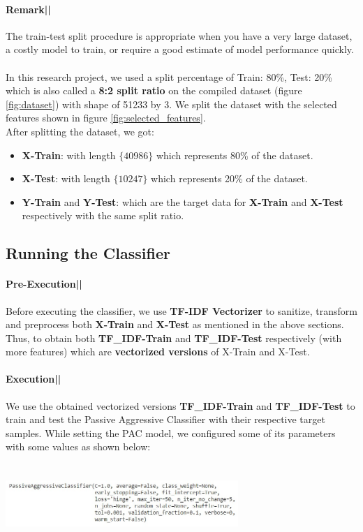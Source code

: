 \documentclass[11.5pt]{article}
\begin{document}
\begin{multicols}{2}
\paragraph{Remark||}
The train-test split procedure is appropriate when you have a very large dataset, a costly model to train, or require a good estimate of model performance quickly.
\paragraph{}
In this research project, we used a split percentage of Train: 80\%, Test: 20\% which is also called a \textbf{8:2 split ratio} on the compiled dataset (figure \ref{fig:dataset}) with shape of 51233 by 3. We split the dataset with the selected features shown in figure \ref{fig:selected_features}.\\
After splitting the dataset, we got:
\begin{itemize}
    \item \textbf{X-Train}: with length $\{40986\}$ which represents 80\% of the dataset.
    \item \textbf{X-Test}: with length $\{10247\}$ which represents 20\% of the dataset.
    \item \textbf{Y-Train} and \textbf{Y-Test}: which are the target data for \textbf{X-Train} and \textbf{X-Test} respectively with the same split ratio.
\end{itemize}

\subsection{Running the Classifier}
\paragraph{Pre-Execution||}
Before executing the classifier, we use \textbf{TF-IDF Vectorizer} to sanitize, transform and preprocess both \textbf{X-Train} and \textbf{X-Test} as mentioned in the above sections. Thus, to obtain both \textbf{TF\_IDF-Train} and \textbf{TF\_IDF-Test} respectively (with more features) which are \textbf{vectorized versions} of X-Train and X-Test.
\paragraph{Execution||}
We use the obtained vectorized versions \textbf{TF\_IDF-Train} and \textbf{TF\_IDF-Test} to train and test the Passive Aggressive Classifier with their respective target samples.
While setting the PAC model, we configured some of its parameters with some values as shown below:
\begin{center}
    \centering
    \qquad
    \includegraphics[width=8.8cm, height=3cm]{pac config.jpg}
    \label{fig:pac_config}
\end{center}


\end{multicols}
\end{document}
